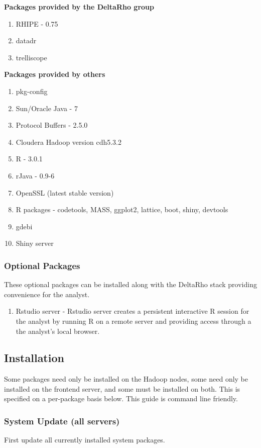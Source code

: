 \textbf{Packages provided by the DeltaRho group}
\begin{enumerate}
\item RHIPE - 0.75
\item datadr
\item trelliscope
\end{enumerate}
\textbf{Packages provided by others}
\begin{enumerate}
\item pkg-config
\item Sun/Oracle Java - 7
\item Protocol Buffers - 2.5.0
\item Cloudera Hadoop version cdh5.3.2
\item R - 3.0.1
\item rJava - 0.9-6
\item OpenSSL (latest stable version)
\item R packages - codetools, MASS, ggplot2, lattice, boot, shiny, devtools
\item gdebi
\item Shiny server
\end{enumerate}

\subsubsection{Optional Packages}
These optional packages can be installed along with the DeltaRho stack providing convenience for the analyst.
\begin{enumerate}
\item Rstudio server - Rstudio server creates a persistent interactive R session for the analyst by running R on a remote server and providing access through a the analyst's local browser.
\end{enumerate}

\newpage

\subsection{Installation}
Some packages need only be installed on the Hadoop nodes, some need only
be installed on the frontend server, and some must be installed on both.
This is specified on a per-package basis below. This guide is command
line friendly.


\subsubsection{System Update (all servers)}
First update all currently installed system packages.

